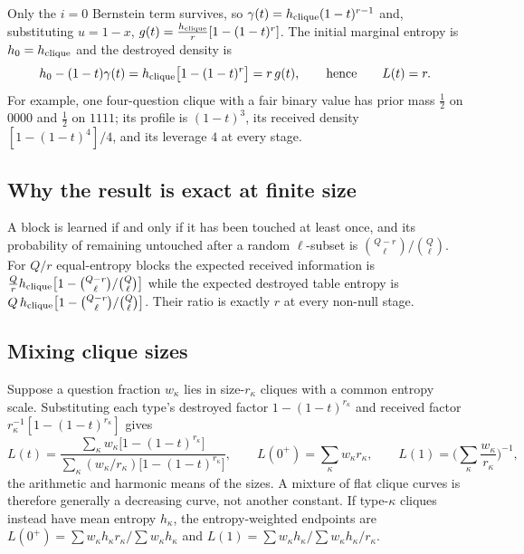 Only the $i = 0$ Bernstein term survives, so
$\gamma(t) = h_{\rm clique}(1-t)^{r-1}$ and, substituting
$u = 1-x$, $g(t) = \tfrac{h_{\rm clique}}{r}[1-(1-t)^r]$. The
initial marginal entropy is $h_0 = h_{\rm clique}$ and the destroyed
density is
%
\begin{equation}
  h_0-(1-t)\gamma(t)
  = h_{\rm clique}\big[1-(1-t)^r\big]
  = r\,g(t),
  \qquad\text{hence}\qquad
  L(t) = r .
  \label{eq:appcliqueL}
\end{equation}
%
For example, one four-question clique with a fair binary value has
prior mass $\tfrac12$ on $0000$ and $\tfrac12$ on $1111$; its profile
is $(1-t)^3$, its received density $[1-(1-t)^4]/4$, and its leverage
$4$ at every stage.

\subsection{Why the result is exact at finite size}

A block is learned if and only if it has been touched at least once,
and its probability of remaining untouched after a random
$\ell$-subset is $\binom{Q-r}{\ell}\big/\binom{Q}{\ell}$. For $Q/r$
equal-entropy blocks the expected received information is
$\tfrac{Q}{r}h_{\rm clique}\big[1-\binom{Q-r}{\ell}/\binom{Q}{\ell}\big]$
while the expected destroyed table entropy is
$Q\,h_{\rm clique}\big[1-\binom{Q-r}{\ell}/\binom{Q}{\ell}\big]$.
Their ratio is exactly $r$ at every non-null stage.

\subsection{Mixing clique sizes}

Suppose a question fraction $w_\kappa$ lies in size-$r_\kappa$
cliques with a common entropy scale. Substituting each type's
destroyed factor $1-(1-t)^{r_\kappa}$ and received factor
$r_\kappa^{-1}[1-(1-t)^{r_\kappa}]$ gives
%
\begin{equation}
  L(t)
  = \frac{\sum_\kappa w_\kappa\big[1-(1-t)^{r_\kappa}\big]}
         {\sum_\kappa (w_\kappa/r_\kappa)
           \big[1-(1-t)^{r_\kappa}\big]},
  \qquad
  L(0^+) = \sum_\kappa w_\kappa r_\kappa,
  \qquad
  L(1) = \Big(\sum_\kappa\frac{w_\kappa}{r_\kappa}\Big)^{-1},
  \label{eq:appcliquemix}
\end{equation}
%
the arithmetic and harmonic means of the sizes. A mixture of flat
clique curves is therefore generally a decreasing curve, not another
constant. If type-$\kappa$ cliques instead have mean entropy
$h_\kappa$, the entropy-weighted endpoints are
$L(0^+) = \sum w_\kappa h_\kappa r_\kappa/\sum w_\kappa h_\kappa$ and
$L(1) = \sum w_\kappa h_\kappa/\sum w_\kappa h_\kappa/r_\kappa$.

